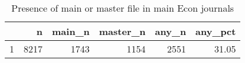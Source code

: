 \begin{table}[ht]
\centering
\caption{Presence of main or master file in main Econ journals} 
\label{tab:master}
\begin{tabular}{rrrrrr}
  \hline
 & n & main\_n & master\_n & any\_n & any\_pct \\ 
  \hline
1 & 8217 & 1743 & 1154 & 2551 & 31.05 \\ 
   \hline
\end{tabular}
\end{table}
